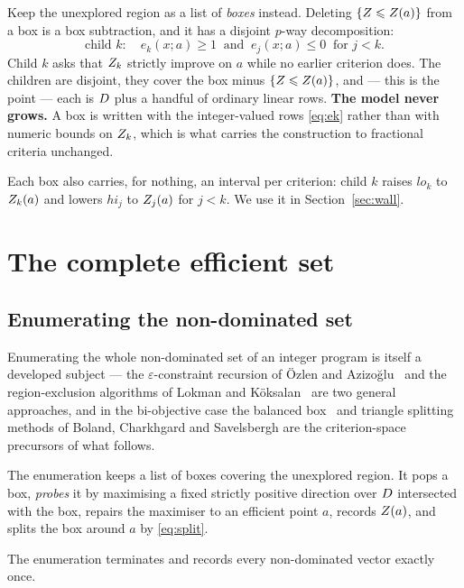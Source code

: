 \documentclass[11pt,a4paper]{article}
\begin{document}
Keep the unexplored region as a list of \emph{boxes} instead.  Deleting
$\{Z \leqslant Z(a)\}$ from a box is a box subtraction, and it has a disjoint
$p$-way decomposition:
\begin{equation}\label{eq:split}
  \text{child } k: \quad e_k(x;a) \geqslant 1
  \ \text{ and } \ e_j(x;a) \leqslant 0 \ \text{ for } j < k .
\end{equation}
Child $k$ asks that $Z_k$ strictly improve on $a$ while no earlier criterion
does.  The children are disjoint, they cover the box minus
$\{Z \leqslant Z(a)\}$, and --- this is the point --- each is $D$ plus a
handful of ordinary linear rows.  \textbf{The model never grows.}  A box is
written with the integer-valued rows \eqref{eq:ek} rather than with numeric
bounds on $Z_k$, which is what carries the construction to fractional
criteria unchanged.

Each box also carries, for nothing, an interval per criterion:
child $k$ raises $lo_k$ to $Z_k(a)$ and lowers $hi_j$ to $Z_j(a)$ for $j<k$.
We use it in Section~\ref{sec:wall}.

\section{The complete efficient set}
\label{sec:complete}

\subsection{Enumerating the non-dominated set}

Enumerating the whole non-dominated set of an integer program is itself a
developed subject --- the $\varepsilon$-constraint recursion of {\"O}zlen and
Azizo{\u{g}}lu~\cite{ozlen2009} and the region-exclusion algorithms of Lokman
and K{\"o}ksalan~\cite{lokman2013} are two general approaches, and in the
bi-objective case the balanced box~\cite{balancedbox} and triangle
splitting~\cite{trianglesplitting} methods of Boland, Charkhgard and
Savelsbergh are the criterion-space precursors of what follows.

The enumeration keeps a list of boxes covering the unexplored region.  It pops
a box, \emph{probes} it by maximising a fixed strictly positive direction over
$D$ intersected with the box, repairs the maximiser to an efficient point
$a$, records $Z(a)$, and splits the box around $a$ by \eqref{eq:split}.

\begin{proposition}\label{prop:front}
The enumeration terminates and records every non-dominated vector exactly once.
\end{proposition}
\end{document}
